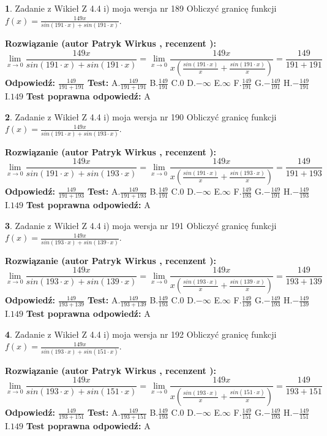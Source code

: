 \documentclass[12pt, a4paper]{article}
\theoremstyle{definition} %
\newtheorem{zad}{}
\newcommand{\zadStart}[1]{\begin{zad}#1\newline}
\newcommand{\zadStop}{\end{zad}}
\newcommand{\rozwStart}[2]{\noindent \textbf{Rozwiązanie (autor #1 , recenzent #2): }\newline}
\newcommand{\rozwStop}{\newline}
\newcommand{\odpStart}{\noindent \textbf{Odpowiedź:}\newline}
\newcommand{\odpStop}{\newline}
\newcommand{\testStart}{\noindent \textbf{Test:}\newline}
\newcommand{\testStop}{\newline}
\newcommand{\kluczStart}{\noindent \textbf{Test poprawna odpowiedź:}\newline}
\newcommand{\kluczStop}{\newline}
\begin{document}
\zadStart{Zadanie z Wikieł Z 4.4 i) moja wersja nr 189}
Obliczyć granicę funkcji $f(x)=\frac{149x}{sin(191\cdot x) +sin(191\cdot x)}$.
\zadStop
\rozwStart{Patryk Wirkus}{}
$$\lim\limits_{x\to 0}\frac{149x}{sin(191\cdot x) +sin(191\cdot x)}=\lim\limits_{x\to 0}\frac{149x}{x(\frac{sin(191\cdot x)}{x}+\frac{sin(191\cdot x)}{x})}=\frac{149}{191+191}$$
\rozwStop
\odpStart
$\frac{149}{191+191}$
\odpStop
\testStart
A.$\frac{149}{191+191}$
B.$\frac{149}{191}$
C.$0$
D.$-\infty$
E.$\infty$
F.$\frac{149}{191}$
G.$-\frac{149}{191}$
H.$-\frac{149}{191}$
I.$149$
\testStop
\kluczStart
A
\kluczStop



\zadStart{Zadanie z Wikieł Z 4.4 i) moja wersja nr 190}
Obliczyć granicę funkcji $f(x)=\frac{149x}{sin(191\cdot x) +sin(193\cdot x)}$.
\zadStop
\rozwStart{Patryk Wirkus}{}
$$\lim\limits_{x\to 0}\frac{149x}{sin(191\cdot x) +sin(193\cdot x)}=\lim\limits_{x\to 0}\frac{149x}{x(\frac{sin(191\cdot x)}{x}+\frac{sin(193\cdot x)}{x})}=\frac{149}{191+193}$$
\rozwStop
\odpStart
$\frac{149}{191+193}$
\odpStop
\testStart
A.$\frac{149}{191+193}$
B.$\frac{149}{191}$
C.$0$
D.$-\infty$
E.$\infty$
F.$\frac{149}{193}$
G.$-\frac{149}{191}$
H.$-\frac{149}{193}$
I.$149$
\testStop
\kluczStart
A
\kluczStop



\zadStart{Zadanie z Wikieł Z 4.4 i) moja wersja nr 191}
Obliczyć granicę funkcji $f(x)=\frac{149x}{sin(193\cdot x) +sin(139\cdot x)}$.
\zadStop
\rozwStart{Patryk Wirkus}{}
$$\lim\limits_{x\to 0}\frac{149x}{sin(193\cdot x) +sin(139\cdot x)}=\lim\limits_{x\to 0}\frac{149x}{x(\frac{sin(193\cdot x)}{x}+\frac{sin(139\cdot x)}{x})}=\frac{149}{193+139}$$
\rozwStop
\odpStart
$\frac{149}{193+139}$
\odpStop
\testStart
A.$\frac{149}{193+139}$
B.$\frac{149}{193}$
C.$0$
D.$-\infty$
E.$\infty$
F.$\frac{149}{139}$
G.$-\frac{149}{193}$
H.$-\frac{149}{139}$
I.$149$
\testStop
\kluczStart
A
\kluczStop



\zadStart{Zadanie z Wikieł Z 4.4 i) moja wersja nr 192}
Obliczyć granicę funkcji $f(x)=\frac{149x}{sin(193\cdot x) +sin(151\cdot x)}$.
\zadStop
\rozwStart{Patryk Wirkus}{}
$$\lim\limits_{x\to 0}\frac{149x}{sin(193\cdot x) +sin(151\cdot x)}=\lim\limits_{x\to 0}\frac{149x}{x(\frac{sin(193\cdot x)}{x}+\frac{sin(151\cdot x)}{x})}=\frac{149}{193+151}$$
\rozwStop
\odpStart
$\frac{149}{193+151}$
\odpStop
\testStart
A.$\frac{149}{193+151}$
B.$\frac{149}{193}$
C.$0$
D.$-\infty$
E.$\infty$
F.$\frac{149}{151}$
G.$-\frac{149}{193}$
H.$-\frac{149}{151}$
I.$149$
\testStop
\kluczStart
A
\kluczStop
\end{document}
